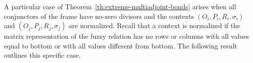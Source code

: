 \documentclass[runningheads,a4paper]{llncs}
\newcommand{\M}{\mathbb{M}}
\newcommand{\adjoint}{\mathop{\&}\nolimits}
\begin{document}



	


A particular case of Theorem~\ref{th:extreme-multiadjoint-bonds} arises when all conjunctors of the frame have no-zero divisors and the contexts $(O_i, P_i, R_i, \sigma_i)$ and $(O_j, P_j, R_j, \sigma_j)$ are normalized. Recall that a context is normalized if the matrix representation of the fuzzy relation has no rows or columns with all values equal to bottom or with all values different from bottom. {The following result outlines this specific case. }
\end{document}
